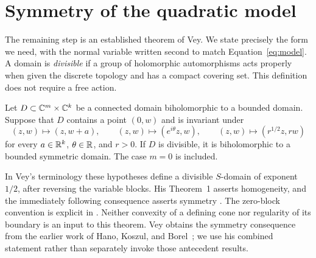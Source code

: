 \section{Symmetry of the quadratic model}\label{sec:symmetry}

The remaining step is an established theorem of Vey.  We state precisely
the form we need, with the normal variable written second to match
Equation~\eqref{eq:model}.  A domain is \emph{divisible} if a group of
holomorphic automorphisms acts properly when given the discrete topology
and has a compact covering set.  This definition does not require a free
action.

\begin{theorem}[Vey]\label{thm:model-symmetry}
Let $D\subset\mathbb C^m\times\mathbb C^k$ be a connected domain biholomorphic to a
bounded domain.  Suppose that $D$ contains a point $(0,w)$ and is invariant
under
\[
 (z,w)\longmapsto(z,w+a),\qquad
 (z,w)\longmapsto(e^{i\theta}z,w),\qquad
 (z,w)\longmapsto(r^{1/2}z,rw)
\]
for every $a\in\mathbb R^k$, $\theta\in\mathbb R$, and $r>0$.
If $D$ is divisible, it is biholomorphic to a bounded symmetric domain.
The case $m=0$ is included.
\end{theorem}

In Vey's terminology these hypotheses define a divisible $S$-domain of
exponent $1/2$, after reversing the variable blocks.  His
Theorem~1 asserts homogeneity, and the immediately following consequence
asserts symmetry \cite[p.~479]{Vey1970}.  The zero-block convention is
explicit in \cite[pp.~480--481]{Vey1970}.  Neither convexity of a defining
cone nor regularity of its boundary is an input to this theorem.
Vey obtains the symmetry consequence from the earlier work of Hano,
Koszul, and Borel~\cite[p.~479]{Vey1970}; we use his combined statement rather than separately
invoke those antecedent results.

